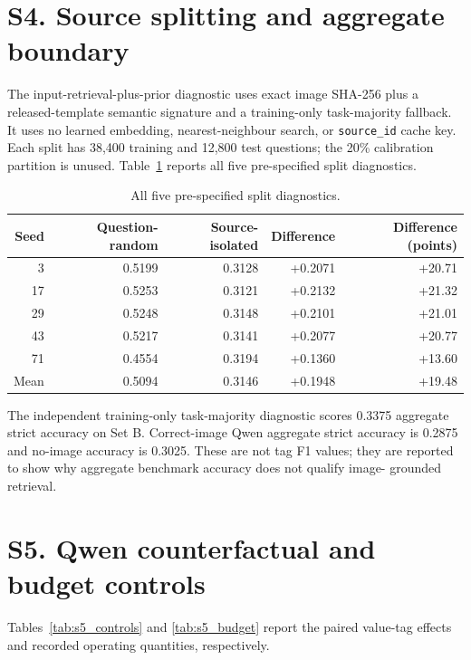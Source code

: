 \documentclass[11pt]{article}
\begin{document}
\section*{S4. Source splitting and aggregate boundary}

The input-retrieval-plus-prior diagnostic uses exact image SHA-256 plus a
released-template semantic signature and a training-only task-majority
fallback. It uses no learned embedding, nearest-neighbour search, or
\texttt{source\_id} cache key. Each split has 38,400 training and 12,800 test
questions; the 20\% calibration partition is unused.
Table~\ref{tab:s4_split} reports all five pre-specified split diagnostics.

\begin{table}[H]
\centering
\caption{All five pre-specified split diagnostics.}
\label{tab:s4_split}
\small
\begin{tabular}{rrrrr}
\toprule
Seed & Question-random & Source-isolated & Difference & Difference (points) \\
\midrule
3 & 0.5199 & 0.3128 & +0.2071 & +20.71 \\
17 & 0.5253 & 0.3121 & +0.2132 & +21.32 \\
29 & 0.5248 & 0.3148 & +0.2101 & +21.01 \\
43 & 0.5217 & 0.3141 & +0.2077 & +20.77 \\
71 & 0.4554 & 0.3194 & +0.1360 & +13.60 \\
\midrule
Mean & 0.5094 & 0.3146 & +0.1948 & +19.48 \\
\bottomrule
\end{tabular}
\end{table}

The independent training-only task-majority diagnostic scores 0.3375 aggregate
strict accuracy on Set B. Correct-image Qwen aggregate strict accuracy is
0.2875 and no-image accuracy is 0.3025. These are not tag F1 values; they are
reported to show why aggregate benchmark accuracy does not qualify image-
grounded retrieval.

\section*{S5. Qwen counterfactual and budget controls}

Tables~\ref{tab:s5_controls} and \ref{tab:s5_budget} report the paired value-tag
effects and recorded operating quantities, respectively.
\end{document}
